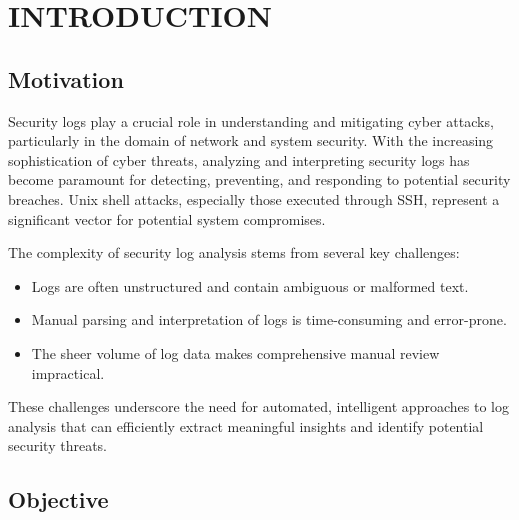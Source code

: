 

\vspace{-1cm}

\section{INTRODUCTION}


    \subsection{Motivation}

        Security logs play a crucial role in understanding and mitigating cyber attacks, particularly in the domain of network and system security. With the increasing sophistication of cyber threats, analyzing and interpreting security logs has become paramount for detecting, preventing, and responding to potential security breaches. Unix shell attacks, especially those executed through SSH, represent a significant vector for potential system compromises.

        The complexity of security log analysis stems from several key challenges:
        
        \begin{itemize}
            \item Logs are often unstructured and contain ambiguous or malformed text.
            \item Manual parsing and interpretation of logs is time-consuming and error-prone.
            \item The sheer volume of log data makes comprehensive manual review impractical.
        \end{itemize}

        These challenges underscore the need for automated, intelligent approaches to log analysis that can efficiently extract meaningful insights and identify potential security threats.

    \subsection{Objective}

